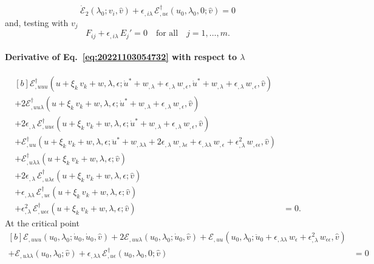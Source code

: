 \documentclass[12pt, final]{scrartcl}
\theoremstyle{definition}
\newcommand{\E}{\mathcal E}
\newcommand{\EE}{\mathcal E ^ \dagger}
\begin{document}
\begin{equation}
  \dot{\E}_2(\lambda_0; v_i, \hat{v}) + \epsilon_{,i\lambda} \, \EE_{,u\epsilon}(u_0, \lambda_0, 0; \hat{v}) = 0
\end{equation}
and, testing with \(v_j\)
\begin{equation}
  F_{ij} + \epsilon_{,i\lambda} \, E_j' = 0 \quad \text{for all} \quad j = 1, \ldots, m.
\end{equation}


\paragraph{Derivative of Eq.~\eqref{eq:20221103054732} with respect to \(\lambda\)}
\begin{equation}
  \begin{aligned}[b]
    \EE_{,uuu}(u + \xi_k \, v_k + w, \lambda, \epsilon; \dot{u}^\ast + w_{,\lambda} + \epsilon_{,\lambda} \, w_{,\epsilon}, \dot{u}^\ast + w_{,\lambda} + \epsilon_{,\lambda} \, w_{,\epsilon}, \hat{v}) &\\
    + 2\EE_{,uu\lambda}(u + \xi_k \, v_k + w, \lambda, \epsilon; \dot{u}^\ast + w_{,\lambda} + \epsilon_{,\lambda} \, w_{,\epsilon}, \hat{v}) &\\
    + 2\epsilon_{,\lambda} \, \EE_{,uu\epsilon}(u + \xi_k \, v_k + w, \lambda, \epsilon; \dot{u}^\ast + w_{,\lambda} + \epsilon_{,\lambda} \, w_{,\epsilon}, \hat{v}) &\\
    + \EE_{,uu}(u + \xi_k \, v_k + w, \lambda, \epsilon; \ddot{u}^\ast + w_{,\lambda\lambda} + 2\epsilon_{,\lambda} \, w_{,\lambda\epsilon} + \epsilon_{,\lambda\lambda} \, w_{,\epsilon} + \epsilon_{,\lambda}^2 \, w_{,\epsilon\epsilon}, \hat{v}) &\\
    + \EE_{,u\lambda\lambda}(u + \xi_k \, v_k + w, \lambda, \epsilon; \hat{v})&\\
    + 2\epsilon_{,\lambda} \, \EE_{,u\lambda\epsilon}(u + \xi_k \, v_k + w, \lambda, \epsilon; \hat{v}) &\\
    + \epsilon_{,\lambda\lambda} \, \EE_{,u\epsilon}(u + \xi_k \, v_k + w, \lambda, \epsilon; \hat{v}) &\\
    + \epsilon_{,\lambda}^2 \, \EE_{,u\epsilon\epsilon}(u + \xi_k \, v_k + w, \lambda, \epsilon; \hat{v}) &= 0.
  \end{aligned}
\end{equation}
At the critical point
\begin{equation*}
  \begin{aligned}[b]
    \E_{,uuu}(u_0, \lambda_0; \dot{u}_0, \dot{u}_0, \hat{v}) + 2\E_{,uu\lambda}(u_0, \lambda_0; \dot{u}_0, \hat{v}) + \E_{,uu}(u_0, \lambda_0; \ddot{u}_0 + \epsilon_{,\lambda\lambda} \, w_\epsilon + \epsilon_{,\lambda}^2 \, w_{\epsilon\epsilon}, \hat{v}) &\\
    + \E_{,u\lambda\lambda}(u_0, \lambda_0; \hat{v}) + \epsilon_{,\lambda\lambda} \, \EE_{,u\epsilon}(u_0, \lambda_0, 0; \hat{v}) &= 0
  \end{aligned}
\end{equation*}
\end{document}

